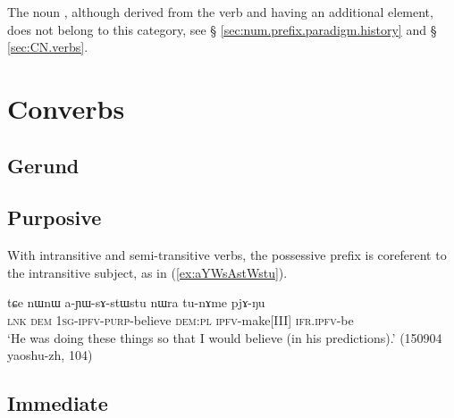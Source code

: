 The noun , although derived from the verb  and having an additional  element, does not belong to this category, see  § \ref{sec:num.prefix.paradigm.history} and § \ref{sec:CN.verbs}.


\section{Converbs}
\subsection{Gerund} \label{sec:gerund}
\subsection{Purposive} \label{sec:purposive.converb}


With intransitive and semi-transitive verbs, the possessive prefix is coreferent to the intransitive subject, as in (\ref{ex:aYWsAstWstu}).

\begin{exe}
\ex \label{ex:aYWsAstWstu}
\gll  tɕe nɯnɯ a-ɲɯ-sɤ-stɯ\redp{}stu nɯra tu-nɤme pjɤ-ŋu \\
\textsc{lnk} \textsc{dem} \textsc{1sg}-\textsc{ipfv}-\textsc{purp}-believe \textsc{dem}:\textsc{pl} \textsc{ipfv}-make[III] \textsc{ifr}.\textsc{ipfv}-be \\
\glt `He was doing these things so that I would believe (in his predictions).' (150904 yaoshu-zh, 104)
\end{exe}

\subsection{Immediate} \label{sec:immediate.converb}
